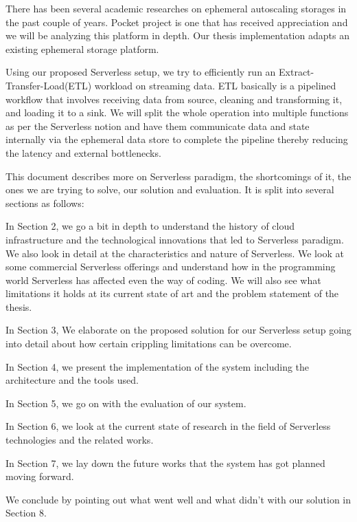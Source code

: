 \documentclass[12pt,titlepage]{article}
\begin{document}
There has been several academic researches on ephemeral autoscaling storages in
the past couple of years. Pocket project is one that has received appreciation
and we will be analyzing this platform in depth. Our thesis implementation
adapts an existing ephemeral storage platform.

Using our proposed Serverless setup, we try to efficiently run an
Extract-Transfer-Load(ETL) workload on streaming data. ETL basically is a
pipelined workflow that involves receiving data
from source, cleaning and transforming it, and loading it to a sink. We will
split the whole operation into multiple functions as per the Serverless notion
and have them communicate data and state internally via the ephemeral data store
to complete the pipeline thereby reducing the latency and external bottlenecks.

This document describes more on Serverless paradigm, the shortcomings of it, the
ones we are trying to solve, our solution and evaluation. It is split into
several sections as follows:

In Section 2, we go a bit in depth to understand the history of cloud
infrastructure and the technological innovations that led to Serverless
paradigm. We also look in detail at the characteristics and nature of
Serverless. We look at some commercial Serverless offerings and understand how
in the programming world Serverless has affected even the way of coding.
We will also see what limitations it holds at its current state of art and
the problem statement of the thesis.

In Section 3, We elaborate on the proposed solution for our Serverless setup going
into detail about how certain crippling limitations can be overcome.

In Section 4, we present the implementation of the system including the architecture and
the tools used.

In Section 5, we go on with the evaluation of our system.

In Section 6, we look at the current state of research in the field of
Serverless technologies and the related works.

In Section 7, we lay down the future works that the system has got planned
moving forward.

We conclude by pointing out what went well and what didn't with our solution in
Section 8.
\end{document}

